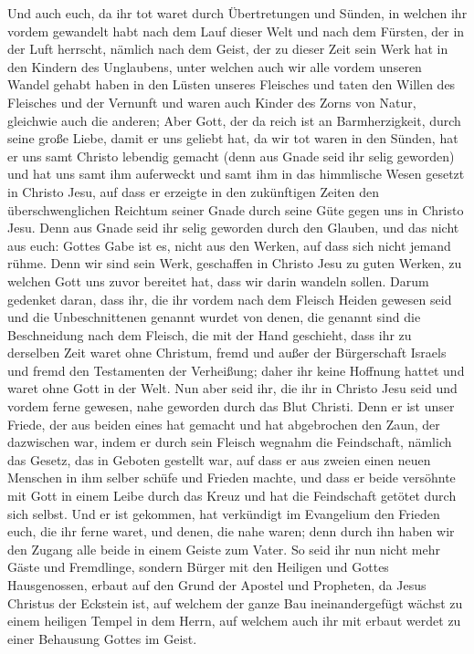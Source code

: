  Und auch euch, da ihr tot waret durch Übertretungen und
Sünden,  in welchen ihr vordem gewandelt habt nach dem
Lauf dieser Welt und nach dem Fürsten, der in der Luft herrscht, nämlich
nach dem Geist, der zu dieser Zeit sein Werk hat in den Kindern des
Unglaubens,  unter welchen auch wir alle vordem unseren
Wandel gehabt haben in den Lüsten unseres Fleisches und taten den Willen
des Fleisches und der Vernunft und waren auch Kinder des Zorns von
Natur, gleichwie auch die anderen;  Aber Gott, der da
reich ist an Barmherzigkeit, durch seine große Liebe, damit er uns
geliebt hat,  da wir tot waren in den Sünden, hat er uns
samt Christo lebendig gemacht (denn aus Gnade seid ihr selig geworden)
 und hat uns samt ihm auferweckt und samt ihm in das
himmlische Wesen gesetzt in Christo Jesu,  auf dass er
erzeigte in den zukünftigen Zeiten den überschwenglichen Reichtum seiner
Gnade durch seine Güte gegen uns in Christo Jesu.  Denn
aus Gnade seid ihr selig geworden durch den Glauben, und das nicht aus
euch: Gottes Gabe ist es,  nicht aus den Werken, auf dass
sich nicht jemand rühme.  Denn wir sind sein Werk,
geschaffen in Christo Jesu zu guten Werken, zu welchen Gott uns zuvor
bereitet hat, dass wir darin wandeln sollen.  Darum
gedenket daran, dass ihr, die ihr vordem nach dem Fleisch Heiden gewesen
seid und die Unbeschnittenen genannt wurdet von denen, die genannt sind
die Beschneidung nach dem Fleisch, die mit der Hand geschieht,
 dass ihr zu derselben Zeit waret ohne Christum, fremd
und außer der Bürgerschaft Israels und fremd den Testamenten der
Verheißung; daher ihr keine Hoffnung hattet und waret ohne Gott in der
Welt.  Nun aber seid ihr, die ihr in Christo Jesu seid
und vordem ferne gewesen, nahe geworden durch das Blut Christi.
 Denn er ist unser Friede, der aus beiden eines hat
gemacht und hat abgebrochen den Zaun, der dazwischen war, indem er durch
sein Fleisch wegnahm die Feindschaft,  nämlich das
Gesetz, das in Geboten gestellt war, auf dass er aus zweien einen neuen
Menschen in ihm selber schüfe und Frieden machte,  und
dass er beide versöhnte mit Gott in einem Leibe durch das Kreuz und hat
die Feindschaft getötet durch sich selbst.  Und er ist
gekommen, hat verkündigt im Evangelium den Frieden euch, die ihr ferne
waret, und denen, die nahe waren;  denn durch ihn haben
wir den Zugang alle beide in einem Geiste zum Vater.  So
seid ihr nun nicht mehr Gäste und Fremdlinge, sondern Bürger mit den
Heiligen und Gottes Hausgenossen,  erbaut auf den Grund
der Apostel und Propheten, da Jesus Christus der Eckstein ist,
 auf welchem der ganze Bau ineinandergefügt wächst zu
einem heiligen Tempel in dem Herrn,  auf welchem auch ihr
mit erbaut werdet zu einer Behausung Gottes im Geist.

